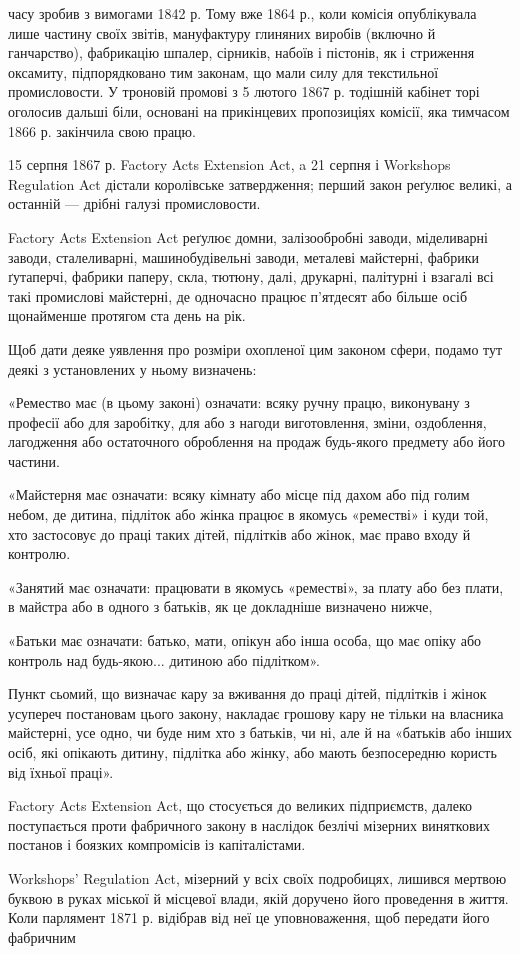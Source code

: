 \parcont{}  %
часу зробив з вимогами 1842 р. Тому вже 1864 р., коли комісія
опублікувала лише частину своїх звітів, мануфактуру глиняних
виробів (включно й ганчарство), фабрикацію шпалер, сірників,
набоїв і пістонів, як і стриження оксамиту, підпорядковано
тим законам, що мали силу для текстильної промисловости.
У троновій промові з 5 лютого 1867 р. тодішній кабінет торі
оголосив дальші біли, основані на прикінцевих пропозиціях
комісії, яка тимчасом 1866 р. закінчила свою працю.

15 серпня 1867 р. Factory Acts Extension Act, a 21 серпня і
Workshops Regulation Act дістали королівське затвердження;
перший закон реґулює великі, а останній — дрібні галузі промисловости.

Factory Acts Extension Act реґулює домни, залізообробні
заводи, міделиварні заводи, сталеливарні, машинобудівельні заводи,
металеві майстерні, фабрики ґутаперчі, фабрики паперу,
скла, тютюну, далі, друкарні, палітурні і взагалі всі такі промислові
майстерні, де одночасно працює п’ятдесят або більше осіб
щонайменше протягом ста день на рік.

Щоб дати деяке уявлення про розміри охопленої цим законом
сфери, подамо тут деякі з установлених у ньому визначень:

«Ремество має (в цьому законі) означати: всяку ручну
працю, виконувану з професії або для заробітку, для або з
нагоди виготовлення, зміни, оздоблення, лагодження або остаточного
оброблення на продаж будь-якого предмету або його
частини.

«Майстерня має означати: всяку кімнату або місце під дахом
або під голим небом, де дитина, підліток або жінка працює в
якомусь «реместві» і куди той, хто застосовує до праці таких
дітей, підлітків або жінок, має право входу й контролю.

«Занятий має означати: працювати в якомусь «реместві»,
за плату або без плати, в майстра або в одного з батьків, як це
докладніше визначено нижче,

«Батьки має означати: батько, мати, опікун або інша особа,
що має опіку або контроль над будь-якою... дитиною або підлітком».

Пункт сьомий, що визначає кару за вживання до праці дітей,
підлітків і жінок усупереч постановам цього закону, накладає
грошову кару не тільки на власника майстерні, усе одно, чи буде
ним хто з батьків, чи ні, але й на «батьків або інших осіб, які
опікають дитину, підлітка або жінку, або мають безпосередню
користь від їхньої праці».

Factory Acts Extension Act, що стосується до великих підприємств,
далеко поступається проти фабричного закону в наслідок
безлічі мізерних виняткових постанов і боязких компромісів
із капіталістами.

Workshops’ Regulation Act, мізерний у всіх своїх подробицях,
лишився мертвою буквою в руках міської й місцевої влади, якій
доручено його проведення в життя. Коли парлямент 1871 р.
відібрав від неї це уповноваження, щоб передати його фабричним
\parbreak{}  %
